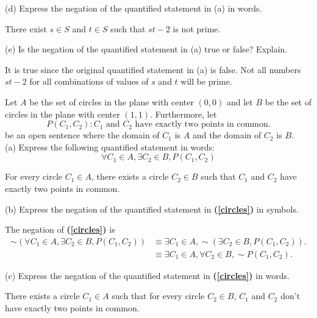 \documentclass[12pt]{article}
\newenvironment{problem}[2][Problem]{\begin{trivlist}
		\item[\hskip \labelsep {\bfseries #1}\hskip \labelsep {\bfseries #2.}]}{\end{trivlist}}
\newenvironment{solution}[2][Solution]{\begin{trivlist}
		\item[\hskip \labelsep {\bfseries #1}\hskip \labelsep {\bfseries #2.}]}{\end{trivlist}}
\begin{document}
\begin{problem}{75}
	(d) Express the negation of the quantified statement in (a) in words.
	\begin{solution}{d}
		There exist $s\in S$ and $t\in S$ such that $st-2$ is not prime.
	\end{solution}
	
	(e) Is the negation of the quantified statement in (a) true or false? Explain.
	\begin{solution}{e}
		It is true since the original quantified statement in (a) is false. Not all numbers $st-2$ for all combinations of values of $s$ and $t$ will be prime.
	\end{solution}
\end{problem}

\begin{problem}{76}
	Let $A$ be the set of circles in the plane with center $(0,0)$ and let $B$ be the set of circles in the plane with center $(1,1).$ Furthermore, let
	\begin{equation*}
		P(C_1,C_2):C_1 \text{ and } C_2 \text{ have exactly two points in common.}
	\end{equation*}
	be an open sentence where the domain of $C_1$ is $A$ and the domain of $C_2$ is $B$.\\
	
	(a) Express the following quantified statement in words:
	\begin{equation}
		\label{circles}
		\forall C_1 \in A, \exists C_2 \in B, P(C_1,C_2)
	\end{equation}
	\begin{solution}{a}
		For every circle $C_1 \in A$, there exists a circle $C_2\in B$ such that $C_1$ and $C_2$ have exactly two points in common.
	\end{solution}

	(b) Express the negation of the quantified statement in \textbf{(\ref{circles})} in symbols.
	\begin{solution}{b}
		The negation of \textbf{(\ref{circles})} is
		\begin{align*}
			\sim (\forall C_1 \in A, \exists C_2 \in B, P(C_1,C_2)) & \equiv \exists C_1 \in A, \sim(\exists C_2 \in B, P(C_1,C_2)).\\
			&\equiv \exists C_1\in A, \forall C_2 \in B, \sim P(C_1,C_2).
		\end{align*}
	\end{solution}

	(c) Express the negation of the quantified statement in \textbf{(\ref{circles})} in words.
	\begin{solution}{c}
		There exists a circle $C_1 \in A$ such that for every circle $C_2 \in B$, $C_1$ and $C_2$ don't have exactly two points in common.
	\end{solution}
\end{problem}
\end{document}
